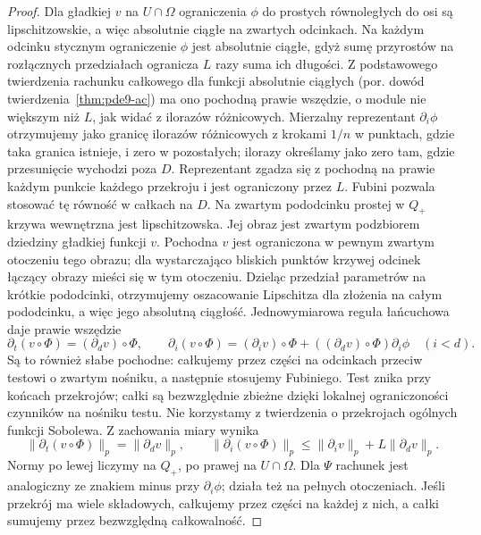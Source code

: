 \begin{proof}
Dla gładkiej $v$ na $U\cap\Omega$ ograniczenia $\phi$
do prostych równoległych do osi są lipschitzowskie,
a więc absolutnie ciągłe na zwartych odcinkach.
Na każdym odcinku stycznym ograniczenie $\phi$ jest
absolutnie ciągłe, gdyż sumę przyrostów na rozłącznych
przedziałach ogranicza $L$ razy suma ich długości.
Z podstawowego twierdzenia rachunku całkowego
dla funkcji absolutnie ciągłych (por. dowód
twierdzenia~\ref{thm:pde9-ac}) ma ono pochodną
prawie wszędzie, o module nie większym niż $L$,
jak widać z ilorazów różnicowych.
Mierzalny reprezentant $\partial_i\phi$ otrzymujemy
jako granicę ilorazów różnicowych z krokami $1/n$
w punktach, gdzie taka granica istnieje, i zero
w pozostałych; ilorazy określamy jako zero tam,
gdzie przesunięcie wychodzi poza $D$. Reprezentant
zgadza się z pochodną na prawie każdym punkcie
każdego przekroju i jest ograniczony przez $L$.
Fubini pozwala stosować tę równość w całkach na $D$.
Na zwartym pododcinku prostej w $Q_+$ krzywa
wewnętrzna jest lipschitzowska. Jej obraz jest
zwartym podzbiorem dziedziny gładkiej funkcji $v$.
Pochodna $v$ jest ograniczona w pewnym zwartym
otoczeniu tego obrazu; dla wystarczająco bliskich
punktów krzywej odcinek łączący obrazy mieści się
w tym otoczeniu. Dzieląc przedział parametrów na
krótkie pododcinki, otrzymujemy oszacowanie
Lipschitza dla złożenia na całym pododcinku,
a więc jego absolutną ciągłość.
Jednowymiarowa reguła łańcuchowa daje prawie wszędzie
\[
 \partial_t(v\circ\Phi)=(\partial_d v)\circ\Phi,\qquad
 \partial_i(v\circ\Phi)=(\partial_i v)\circ\Phi+
    ((\partial_d v)\circ\Phi)\partial_i\phi\quad(i<d).
\]
Są to również słabe pochodne: całkujemy przez części
na odcinkach przeciw testowi o zwartym nośniku,
a następnie stosujemy Fubiniego. Test znika przy końcach
przekrojów; całki są bezwzględnie zbieżne dzięki
lokalnej ograniczoności czynników na nośniku testu.
Nie korzystamy z twierdzenia o przekrojach ogólnych
funkcji Sobolewa. Z zachowania miary wynika
\[
 \|\partial_t(v\circ\Phi)\|_p=\|\partial_d v\|_p,\qquad
 \|\partial_i(v\circ\Phi)\|_p
 \le\|\partial_i v\|_p+L\|\partial_d v\|_p.
\]
Normy po lewej liczymy na $Q_+$, po prawej na $U\cap\Omega$.
Dla $\Psi$ rachunek jest analogiczny ze znakiem minus
przy $\partial_i\phi$; działa też na pełnych otoczeniach.
Jeśli przekrój ma wiele składowych, całkujemy przez części
na każdej z nich, a całki sumujemy przez bezwzględną
całkowalność.


\end{proof}
